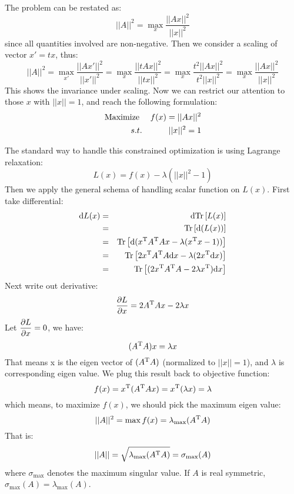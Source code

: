 The problem can be restated as:
\begin{equation}
	||A||^2 = \max_{x}{\frac{||Ax||^2}{||x||^2}}
\end{equation}
since all quantities involved are non-negative. Then we consider a 
scaling of vector $x' = tx$, thus:
\begin{equation}
	||A||^2 = \max_{x'}{\frac{||Ax'||^2}{||x'||^2}} 
	=\max_{x}{\frac{||tAx||^2}{||tx||^2}}
	=\max_{x}{\frac{t^2||Ax||^2}{t^2||x||^2}}
	=\max_{x}{\frac{||Ax||^2}{||x||^2}}
\end{equation}
This shows the invariance under scaling. Now we can restrict our attention 
to those $x$ with $||x||=1$, and reach the following formulation:
\begin{eqnarray}
	\mathrm{Maximize~} && f(x) = ||Ax||^2 \\
	s.t. && ||x||^2 = 1
\end{eqnarray}

The standard way to handle this constrained optimization is 
using Lagrange relaxation:
\begin{equation}
	L(x) = f(x) - \lambda (||x||^2 - 1)
\end{equation}
Then we apply the general schema of handling scalar function 
on $L(x)$. First take differential:
\begin{eqnarray}
	\mathrm{d}L(x) &=& \mathrm{d}\mathrm{Tr}\left[L(x)\right] \\
	&=& \mathrm{Tr}\left[ \mathrm{d}( L(x) ) \right] \\
	&=& \mathrm{Tr}\left[ \mathrm{d}( x^\mathrm{T}A^\mathrm{T}Ax - \lambda(x^\mathrm{T}x - 1)) \right]  \\
	&=& \mathrm{Tr}\left[ 2 x^\mathrm{T} A^\mathrm{T}A \mathrm{d}x - \lambda (2 x^\mathrm{T} \mathrm{d}x) \right] \\
	&=& \mathrm{Tr}\left[ (2 x^\mathrm{T} A^\mathrm{T}A - 2\lambda x^\mathrm{T}) \mathrm{d}x \right]
\end{eqnarray}
Next write out derivative:
\begin{equation}
	\dfrac{\partial L}{\partial x} = 2 A^\mathrm{T}A x - 2\lambda x
\end{equation}
Let $\dfrac{\partial L}{\partial x} = 0$, we have:
\begin{equation}
	(A^\mathrm{T}A) x = \lambda x
\end{equation}
That means x is the eigen vector of $(A^\mathrm{T}A)$
(normalized to $||x||=1$), and $\lambda$ 
is corresponding eigen value. We plug this result back to objective 
function:
\begin{equation}
	f(x) = x^\mathrm{T}(A^\mathrm{T}Ax) =x^\mathrm{T} (\lambda x) = \lambda
\end{equation}
which means, to maximize $f(x)$, we should pick the maximum 
eigen value:
\begin{equation}
	||A||^2 = \max f(x) = \lambda_{\max}(A^\mathrm{T}A)
\end{equation}
That is:
\begin{equation}
	||A|| = \sqrt{\lambda_{\max}(A^\mathrm{T}A)} = \sigma_{\max}(A)
\end{equation}
where $\sigma_{\max}$ denotes the maximum singular value. 
If $A$ is real symmetric, $\sigma_{\max}(A) = \lambda_{\max}(A) $. 

